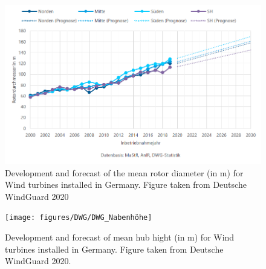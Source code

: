 \documentclass[a4paper,11pt]{article}
\begin{document}
\begin{figure}

{\centering \includegraphics[width=1\linewidth]{figures/DWG/DWG_Rotordurchmesser} 

}

\caption{Development and forecast of the mean rotor diameter (in m) for Wind turbines installed in Germany. Figure taken from Deutsche WindGuard 2020}\label{fig:rotor}
\end{figure}
\begin{figure}[H]

{\centering \texttt{[image: figures/DWG/DWG\_Nabenhöhe]} 

}

\caption{Development and forecast of mean hub hight (in m) for Wind turbines installed in Germany. Figure taken from Deutsche WindGuard 2020.}\label{fig:nabe}
\end{figure}
\end{document}
